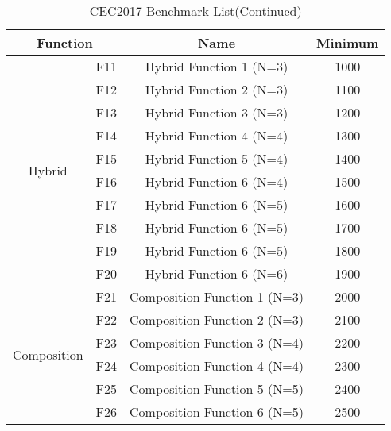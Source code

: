 \documentclass[preprint,review,compress,12pt]{elsarticle}
\begin{document}
\begin{table}[H]
\centering
\renewcommand{\thetable}{2}
\caption{CEC2017 Benchmark List(Continued)}
\begin{tabular}{cccc}
\toprule
\multicolumn{2}{c}{Function}        & Name                                                       & Minimum  \\
\midrule
\multirow{10}{*}{Hybrid}  & F11 & Hybrid Function 1 (N=3)                                   & 1000 \\
                        & F12 & Hybrid Function 2   (N=3)                                 & 1100 \\
                        & F13 & Hybrid Function 3   (N=3)                                 & 1200 \\
                        & F14 & Hybrid Function 4   (N=4)                                 & 1300 \\
                        & F15 & Hybrid Function 5   (N=4)                                 & 1400 \\
                        & F16 & Hybrid Function 6   (N=4)                                 & 1500 \\
                        & F17 & Hybrid Function 6   (N=5)                                 & 1600 \\
                        & F18 & Hybrid Function 6   (N=5)                                 & 1700 \\
                        & F19 & Hybrid Function 6   (N=5)                                 & 1800 \\
                        & F20 & Hybrid Function 6 (N=6)                                   & 1900 \\
\midrule
\multirow{10}{*}{Composition}  & F21 & Composition Function 1 (N=3)                              & 2000 \\
                        & F22 & Composition   Function 2 (N=3)                            & 2100 \\
                        & F23 & Composition   Function 3 (N=4)                            & 2200 \\
                        & F24 & Composition   Function 4 (N=4)                            & 2300 \\
                        & F25 & Composition   Function 5 (N=5)                            & 2400 \\
                        & F26 & Composition   Function 6 (N=5)                            & 2500 \\

\end{tabular}
\end{table}
\end{document}
